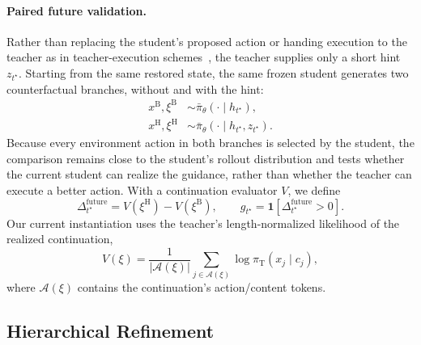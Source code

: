 \documentclass{article}
\begin{document}
\paragraph{Paired future validation.}
Rather than replacing the student's proposed action or handing execution to the teacher as in
teacher-execution schemes~\citep{li2026policy,xia2026dash}, the teacher supplies only a short hint
$z_{t^\star}$.  Starting from the same restored state, the same frozen student generates two
counterfactual branches, without and with the hint:
\begin{align}
    x^{\mathrm B},\xi^{\mathrm B}
    &\sim\bar\pi_\theta(\cdot\mid h_{t^\star}),\\
    x^{\mathrm H},\xi^{\mathrm H}
    &\sim\bar\pi_\theta(\cdot\mid h_{t^\star},z_{t^\star}).
    \label{eq:gi-paired-branches}
\end{align}
Because every environment action in both branches is selected by the student, the comparison remains
close to the student's rollout distribution and tests whether the current student can realize the
guidance, rather than whether the teacher can execute a better action.  With a continuation evaluator
$V$, we define
\begin{equation}
    \Delta_{t^\star}^{\mathrm{future}}
    =V(\xi^{\mathrm H})-V(\xi^{\mathrm B}),
    \qquad
    g_{t^\star}
    =\mathbf 1[\Delta_{t^\star}^{\mathrm{future}}>0].
    \label{eq:future-validation-gate}
\end{equation}
Our current instantiation uses the teacher's length-normalized likelihood of the realized continuation,
\begin{equation}
    V(\xi)
    =\frac{1}{|\mathcal A(\xi)|}
      \sum_{j\in\mathcal A(\xi)}
      \log\pi_{\mathrm T}(x_j\mid c_j),
    \label{eq:future-evaluator}
\end{equation}
where $\mathcal A(\xi)$ contains the continuation's action/content tokens.

\subsection{Hierarchical Refinement}
\end{document}
